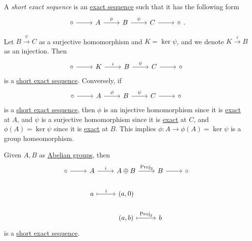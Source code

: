 \begin{definition}\label{def:short-exact-sequence}
	A \emph{short exact sequence} is an \hyperref[def:exact-sequence]{exact sequence} such that it has the following form
	\[
		\begin{tikzcd}
			\circ & A & B & C & \circ
			\arrow["\phi", from=1-2, to=1-3]
			\arrow["\psi", from=1-3, to=1-4]
			\arrow[from=1-1, to=1-2]
			\arrow[from=1-4, to=1-5]
		\end{tikzcd}.
	\]
\end{definition}

\begin{remark}
	Let \(B \overset{\psi}{\longrightarrow} C\) as a surjective homomorphism and \(K = \ker  \psi \), and we denote \(K \overset{i}{\longrightarrow}B \) as an injection. Then
	\[
		\begin{tikzcd}
			\circ & K & B & C & \circ
			\arrow["i", from=1-2, to=1-3]
			\arrow["\psi", from=1-3, to=1-4]
			\arrow[from=1-1, to=1-2]
			\arrow[from=1-4, to=1-5]
		\end{tikzcd}
	\]
	is a \hyperref[def:short-exact-sequence]{short exact sequence}. Conversely, if
	\[
		\begin{tikzcd}
			\circ & A & B & C & \circ
			\arrow["\phi ", from=1-2, to=1-3]
			\arrow["\psi", from=1-3, to=1-4]
			\arrow[from=1-1, to=1-2]
			\arrow[from=1-4, to=1-5]
		\end{tikzcd}
	\]
	is a \hyperref[def:short-exact-sequence]{short exact sequence}, then \(\phi \) is an injective homomorphism since it is \hyperref[def:apx:exact]{exact} at \(A\),
	and \(\psi \) is a surjective homomorphism since it is \hyperref[def:apx:exact]{exact} at \(C\), and \(\phi (A) = \ker \psi\) since it is \hyperref[def:apx:exact]{exact} at \(B\).
	This implies \(\phi \colon A\to \phi (A) = \ker  \psi \) is a group homeomorphism.
\end{remark}
\begin{eg}
	Given \(A, B\) as \hyperref[def:Abelian-group]{Abelian groups}, then
	\[
		\begin{tikzcd}
			\circ & A & {A\oplus B} & B & \circ \\
			& a & {(a, 0)} \\
			&& {(a, b)} & b
			\arrow["i", from=1-2, to=1-3]
			\arrow["{\mathrm{Proj}_2}", from=1-3, to=1-4]
			\arrow[from=1-1, to=1-2]
			\arrow[from=1-4, to=1-5]
			\arrow["i", maps to, from=2-2, to=2-3]
			\arrow["{\mathrm{Proj}_2}", maps to, from=3-3, to=3-4]
		\end{tikzcd}
	\]
	is a \hyperref[def:short-exact-sequence]{short exact sequence}.
\end{eg}
